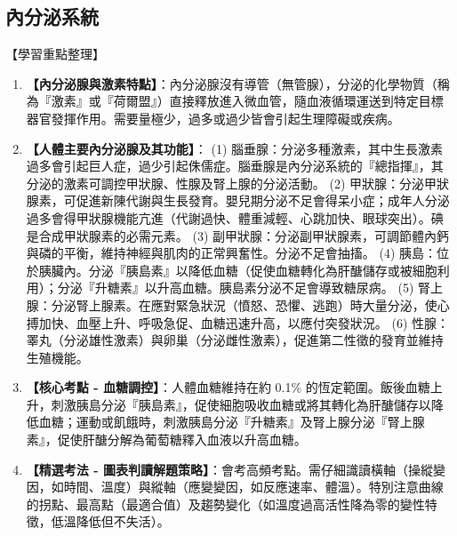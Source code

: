 \documentclass[11pt,a4paper]{article}
\begin{document}
\subsection{內分泌系統}
\begin{learningpoints}{【學習重點整理】}
\begin{enumerate}[label=\arabic*.]
  \item \textbf{【內分泌腺與激素特點】}：內分泌腺沒有導管（無管腺），分泌的化學物質（稱為『激素』或『荷爾盟』）直接釋放進入微血管，隨血液循環運送到特定目標器官發揮作用。需要量極少，過多或過少皆會引起生理障礙或疾病。
  \item \textbf{【人體主要內分泌腺及其功能】}：
  (1) 腦垂腺：分泌多種激素，其中生長激素過多會引起巨人症，過少引起侏儒症。腦垂腺是內分泌系統的『總指揮』，其分泌的激素可調控甲狀腺、性腺及腎上腺的分泌活動。
  (2) 甲狀腺：分泌甲狀腺素，可促進新陳代謝與生長發育。嬰兒期分泌不足會得呆小症；成年人分泌過多會得甲狀腺機能亢進（代謝過快、體重減輕、心跳加快、眼球突出）。碘是合成甲狀腺素的必需元素。
  (3) 副甲狀腺：分泌副甲狀腺素，可調節體內鈣與磷的平衡，維持神經與肌肉的正常興奮性。分泌不足會抽搐。
  (4) 胰島：位於胰臟內。分泌『胰島素』以降低血糖（促使血糖轉化為肝醣儲存或被細胞利用）；分泌『升糖素』以升高血糖。胰島素分泌不足會導致糖尿病。
  (5) 腎上腺：分泌腎上腺素。在應對緊急狀況（憤怒、恐懼、逃跑）時大量分泌，使心搏加快、血壓上升、呼吸急促、血糖迅速升高，以應付突發狀況。
  (6) 性腺：睪丸（分泌雄性激素）與卵巢（分泌雌性激素），促進第二性徵的發育並維持生殖機能。
  \item \textbf{【核心考點 - 血糖調控】}：人體血糖維持在約 0.1\% 的恆定範圍。飯後血糖上升，刺激胰島分泌『胰島素』，促使細胞吸收血糖或將其轉化為肝醣儲存以降低血糖；運動或飢餓時，刺激胰島分泌『升糖素』及腎上腺分泌『腎上腺素』，促使肝醣分解為葡萄糖釋入血液以升高血糖。
  \item \textbf{【精選考法 - 圖表判讀解題策略】}：會考高頻考點。需仔細識讀橫軸（操縱變因，如時間、溫度）與縱軸（應變變因，如反應速率、體溫）。特別注意曲線的拐點、最高點（最適合值）及趨勢變化（如溫度過高活性降為零的變性特徵，低溫降低但不失活）。
\end{enumerate}
\end{learningpoints}
\end{document}
